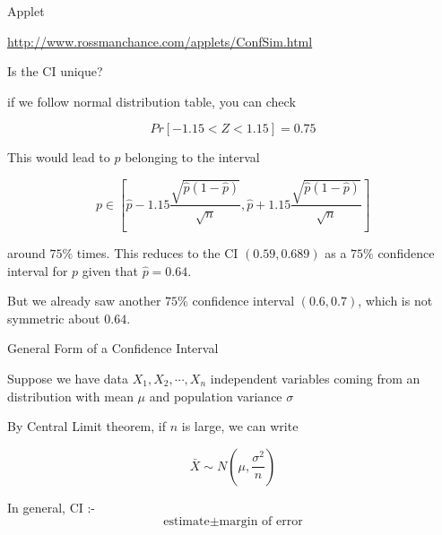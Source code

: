 \documentclass{beamer}\usepackage[]{graphicx}\usepackage[]{color}
\begin{document}
\begin{frame}{Applet}

\url{http://www.rossmanchance.com/applets/ConfSim.html}

\end{frame}

\begin{frame}{Is the CI unique?}

if we follow normal distribution table, you can check

$$ Pr \left [ -1.15 < Z < 1.15 \right ] = 0.75 $$

This would lead to $p$ belonging to the interval 

$$ p \in \left [ \hat{p} - 1.15 \frac{\sqrt{\hat{p}(1-\hat{p})}}{\sqrt{n}}, \hat{p} + 1.15 \frac{\sqrt{\hat{p}(1-\hat{p})}}{\sqrt{n}} \right ] $$

around $75 \%$ times. This reduces to the CI $(0.59, 0.689)$ as a $75 \%$ confidence interval for $p$ given that $\hat{p}=0.64$.

But we already saw another $75\%$ confidence interval $(0.6,0.7)$, which is not symmetric about $0.64$.

\end{frame}

\begin{frame}{General Form of a Confidence Interval}

Suppose we have data $X_{1}, X_{2}, \cdots, X_{n}$ independent variables coming from an distribution with mean $\mu$ and population variance $\sigma$ \pause

By Central Limit theorem, if $n$ is large, we can write 

$$ \bar{X} \sim N \left ( \mu, \frac{\sigma^2}{n} \right ) $$ \pause

In general, CI :- $$\mbox{estimate} \pm \mbox{margin of error} $$ 

\end{frame}
\end{document}
